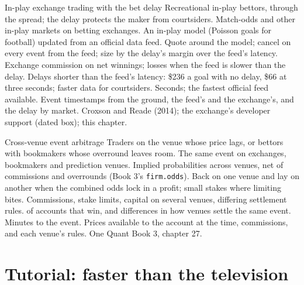 \begin{strategyfile}{In-play exchange trading with the bet delay}\label{strat:hf:prediction-and-sports-market-making:inplay}
 Recreational in-play bettors, through the spread; the delay protects the maker from courtsiders.
 Match-odds and other in-play markets on betting exchanges.
 An in-play model (Poisson goals for football) updated from an official data feed.
 Quote around the model; cancel on every event from the feed; size by the delay's margin over the feed's latency.
 Exchange commission on net winnings; losses when the feed is slower than the delay.
 Delays shorter than the feed's latency: \$236 a goal with no delay, \$66 at three seconds; faster data for courtsiders.
 Seconds; the fastest official feed available.
 Event timestamps from the ground, the feed's and the exchange's, and the delay by market.
 Croxson and Reade (2014); the exchange's developer support (dated box); this chapter.
\end{strategyfile}

\begin{strategyfile}{Cross-venue event arbitrage}\label{strat:hf:prediction-and-sports-market-making:cross}
 Traders on the venue whose price lags, or bettors with bookmakers whose overround leaves room.
 The same event on exchanges, bookmakers and prediction venues.
 Implied probabilities across venues, net of commissions and overrounds (Book 3's \texttt{firm.odds}).
 Back on one venue and lay on another when the combined odds lock in a profit; small stakes where limiting bites.
 Commissions, stake limits, capital on several venues, differing settlement rules.
  of accounts that win, and differences in how venues settle the same event.
 Minutes to the event.
 Prices available to the account at the time, commissions, and each venue's rules.
 One Quant Book 3, chapter 27.
\end{strategyfile}

\section{Tutorial: faster than the television}\label{tut:hf:prediction-and-sports-market-making:tut}

